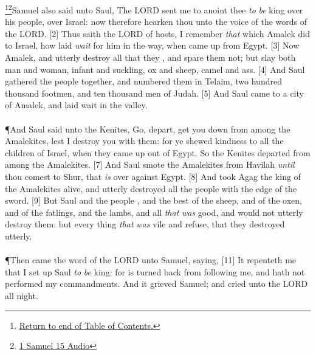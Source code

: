 \footnote{\textcolor[cmyk]{0.99998,1,0,0}{\hyperlink{TOC}{Return to end of Table of Contents.}}}\footnote{\href{https://audiobible.com/bible/1_samuel_15.html}{\textcolor[cmyk]{0.99998,1,0,0}{1 Samuel 15 Audio}}}\textcolor[cmyk]{0.99998,1,0,0}{Samuel also said unto Saul, The LORD sent me to anoint thee \emph{to} \emph{be} king over his people, over Israel: now therefore hearken thou unto the voice of the words of the LORD.}
[2] \textcolor[cmyk]{0.99998,1,0,0}{Thus saith the LORD of hosts, I remember \emph{that} which Amalek did to Israel, how  laid \emph{wait} for him in the way, when  came up from Egypt.}
[3] \textcolor[cmyk]{0.99998,1,0,0}{Now  Amalek, and utterly destroy all that they  , and spare them not; but slay both man and woman, infant and suckling, ox and sheep, camel and ass.}
[4] \textcolor[cmyk]{0.99998,1,0,0}{And Saul gathered the people together, and numbered them in Telaim, two hundred thousand footmen, and ten thousand men of Judah.}
[5] \textcolor[cmyk]{0.99998,1,0,0}{And Saul came to a city of Amalek, and laid wait in the valley.}\\
\\
\P \textcolor[cmyk]{0.99998,1,0,0}{And Saul said unto the Kenites, Go, depart, get you down from among the Amalekites, lest I destroy you with them: for ye shewed kindness to all the children of Israel, when they came up out of Egypt. So the Kenites departed from among the Amalekites.}
[7] \textcolor[cmyk]{0.99998,1,0,0}{And Saul smote the Amalekites from Havilah \emph{until} thou comest to Shur, that \emph{is} over against Egypt.}
[8] \textcolor[cmyk]{0.99998,1,0,0}{And  took Agag the king of the Amalekites alive, and utterly destroyed all the people with the edge of the sword.}
[9] \textcolor[cmyk]{0.99998,1,0,0}{But Saul and the people , and the best of the sheep, and of the oxen, and of the fatlings, and the lambs, and all \emph{that} \emph{was} good, and would not utterly destroy them: but every thing \emph{that} \emph{was} vile and refuse, that they destroyed utterly.}\\
\\
\P \textcolor[cmyk]{0.99998,1,0,0}{Then came the word of the LORD unto Samuel, saying,}
[11] \textcolor[cmyk]{0.99998,1,0,0}{It repenteth me that I   set up Saul \emph{to} \emph{be} king: for  is turned back from following me, and hath not performed my commandments. And it grieved Samuel; and  cried unto the LORD all night.}
